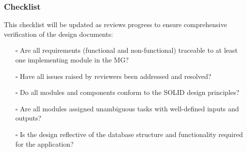 \documentclass[12pt, titlepage]{article}
\begin{document}
\subsubsection{Checklist}
This checklist will be updated as reviews progress to ensure comprehensive
verification of the design documents:
\begin{itemize}
  \item[$\square$] Are all requirements (functional and non-functional)
  traceable to at least one implementing module in the MG?
  \item[$\square$] Have all issues raised by reviewers been addressed and
  resolved?
  \item[$\square$] Do all modules and components conform to the SOLID design
  principles?
  \item[$\square$] Are all modules assigned unambiguous tasks with well-defined
  inputs and outputs?
  \item[$\square$] Is the design reflective of the database structure and
  functionality required for the application?
\end{itemize}
\end{document}
